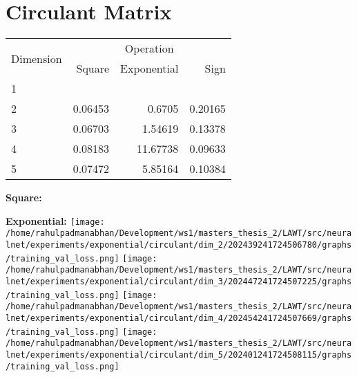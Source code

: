 \documentclass{article}
\begin{document}

\pagebreak
\section{Circulant Matrix}
\begin{tabular}{@{}lrrr@{}}
\toprule
\multirow{2}{*}{Dimension} & \multicolumn{3}{c}{Operation} \\
\cmidrule(l){2-4}
& Square & Exponential & Sign \\
\midrule
1 & & & \\
2 & 0.06453 & 0.6705 & 0.20165 \\
3 & 0.06703 & 1.54619 & 0.13378 \\
4 & 0.08183 & 11.67738 & 0.09633 \\
5 & 0.07472 & 5.85164 & 0.10384 \\
\bottomrule
\end{tabular}

\textbf{Square:}

\textbf{Exponential:}
\texttt{[image: /home/rahulpadmanabhan/Development/ws1/masters\_thesis\_2/LAWT/src/neuralnet/experiments/exponential/circulant/dim\_2/202439241724506780/graphs/training\_val\_loss.png]}
\texttt{[image: /home/rahulpadmanabhan/Development/ws1/masters\_thesis\_2/LAWT/src/neuralnet/experiments/exponential/circulant/dim\_3/202447241724507225/graphs/training\_val\_loss.png]}
\texttt{[image: /home/rahulpadmanabhan/Development/ws1/masters\_thesis\_2/LAWT/src/neuralnet/experiments/exponential/circulant/dim\_4/202454241724507669/graphs/training\_val\_loss.png]}
\texttt{[image: /home/rahulpadmanabhan/Development/ws1/masters\_thesis\_2/LAWT/src/neuralnet/experiments/exponential/circulant/dim\_5/202401241724508115/graphs/training\_val\_loss.png]}
\end{document}
